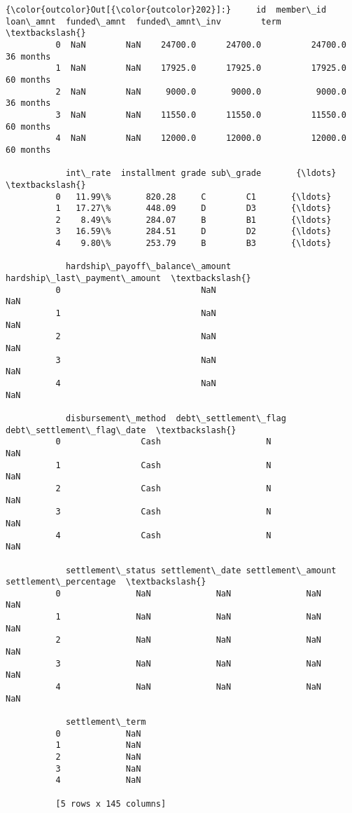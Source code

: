 \documentclass[11pt]{article}
\begin{document}
\begin{Verbatim}[commandchars=\\\{\}]
{\color{outcolor}Out[{\color{outcolor}202}]:}     id  member\_id  loan\_amnt  funded\_amnt  funded\_amnt\_inv        term  \textbackslash{}
          0  NaN        NaN    24700.0      24700.0          24700.0   36 months   
          1  NaN        NaN    17925.0      17925.0          17925.0   60 months   
          2  NaN        NaN     9000.0       9000.0           9000.0   36 months   
          3  NaN        NaN    11550.0      11550.0          11550.0   60 months   
          4  NaN        NaN    12000.0      12000.0          12000.0   60 months   
          
            int\_rate  installment grade sub\_grade       {\ldots}        \textbackslash{}
          0   11.99\%       820.28     C        C1       {\ldots}         
          1   17.27\%       448.09     D        D3       {\ldots}         
          2    8.49\%       284.07     B        B1       {\ldots}         
          3   16.59\%       284.51     D        D2       {\ldots}         
          4    9.80\%       253.79     B        B3       {\ldots}         
          
            hardship\_payoff\_balance\_amount hardship\_last\_payment\_amount  \textbackslash{}
          0                            NaN                          NaN   
          1                            NaN                          NaN   
          2                            NaN                          NaN   
          3                            NaN                          NaN   
          4                            NaN                          NaN   
          
            disbursement\_method  debt\_settlement\_flag debt\_settlement\_flag\_date  \textbackslash{}
          0                Cash                     N                       NaN   
          1                Cash                     N                       NaN   
          2                Cash                     N                       NaN   
          3                Cash                     N                       NaN   
          4                Cash                     N                       NaN   
          
            settlement\_status settlement\_date settlement\_amount  settlement\_percentage  \textbackslash{}
          0               NaN             NaN               NaN                    NaN   
          1               NaN             NaN               NaN                    NaN   
          2               NaN             NaN               NaN                    NaN   
          3               NaN             NaN               NaN                    NaN   
          4               NaN             NaN               NaN                    NaN   
          
            settlement\_term  
          0             NaN  
          1             NaN  
          2             NaN  
          3             NaN  
          4             NaN  
          
          [5 rows x 145 columns]
\end{Verbatim}
            
\end{document}
